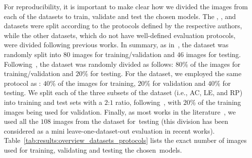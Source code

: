For reproducibility, it is important to make clear how we divided the images from each of the datasets to train, validate and test the chosen models.
The \stills, \ssigsegplate, \ufpralpr and \dataset datasets were split according to the protocols defined by the respective authors, while the other datasets, which do not have well-defined evaluation protocols, were divided following previous works.
In summary, as in~\citep{xiang2019lightweight,henry2020multinational}, the \caltech dataset was randomly split into $80$ images for training/validation and $46$ images for testing.
Following~\citep{panahi2017accurate,beratoglu2021vehicle}, the \englishlp dataset was randomly divided as follows: $80$\% of the images for training/validation and $20$\% for testing.
For the \chineselp dataset, we employed the same protocol as \cite{laroca2021efficient}: $40$\% of the images for training, $20$\% for validation and $40$\% for testing.
We split each of the three subsets of the \aolp dataset (i.e., AC, LE, and RP) into training and test sets with a $2$:$1$ ratio, following~\citep{xie2018new,liang2021egsanet}, with $20$\%
of the training images being used for validation.
Finally, as most works in the literature~\citep{masood2017sighthound,laroca2021efficient,silva2022flexible}, we used all the $108$ images from the \openalpreu dataset for~testing (this division has been considered as a mini leave-one-dataset-out evaluation in recent works).
Table~\ref{tab:results:overview_datasets_protocols} lists the exact number of images used for training, validating and testing the chosen~models.

\begin{table}[!htb]
\centering
\caption{An overview of the number of images from each dataset used for training, validation, and testing.}
\label{tab:results:overview_datasets_protocols}
\vspace{-0.75mm}
\end{table}

